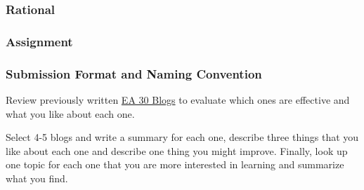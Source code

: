 
\subsubsection{Rational}

\subsubsection{Assignment}

\subsubsection{Submission Format and Naming Convention}

Review previously written \href{https://marclos.github.io/Climate_Change_Narratives/}{EA 30 Blogs} to evaluate which ones are effective and what you like about each one. 

Select 4-5 blogs and write a summary for each one, describe three things that you like about each one and describe one thing you might improve. Finally, look up one topic for each one that you are more interested in learning and summarize what you find.